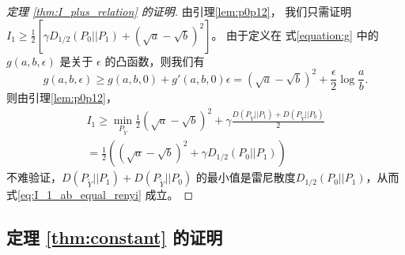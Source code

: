 \begin{proof}[定理 \ref{thm:I_plus_relation} 的证明]
    由引理\ref{lem:p0p12}，
    我们只需证明 $I_1 \geq \frac{1}{2}[\gamma D_{1/2}(P_0||P_1)
    + (\sqrt{a} - \sqrt{b})^2]$。
    由于定义在 式\eqref{equation:g} 中的 $g(a,b,\epsilon)$ 是关于 $\epsilon$
    的凸函数，则我们有
    \begin{equation}\label{eq:g_linear}
            g(a,b,\epsilon) \geq g(a,b,0) + g'(a,b,0)\epsilon = (\sqrt{a} - \sqrt{b})^2 + \frac{\epsilon}{2}\log \frac{a}{b}. 
        \end{equation}
        则由引理\ref{lem:p0p12}，
        \begin{align}
            I_1 \geq \min_{P_{\widetilde{Y}}}
            \frac{1}{2}(\sqrt{a}-\sqrt{b})^2+\gamma
            \frac{D(P_{\widetilde{Y}} || P_1) + D(P_{\widetilde{Y}} || P_0)}{2} \\
            = \frac{1}{2}((\sqrt{a}-\sqrt{b})^2+\gamma D_{1/2}(P_0||P_1))
            \label{eq:I_1_ab_equal_renyi}
        \end{align}
        不难验证，$D(P_{\widetilde{Y}} || P_1) + D(P_{\widetilde{Y}} || P_0)$
        的最小值是雷尼散度$D_{1/2}(P_0||P_1)$，从而
        式\eqref{eq:I_1_ab_equal_renyi} 成立。
\end{proof}

\subsection{定理 \ref{thm:constant} 的证明}

